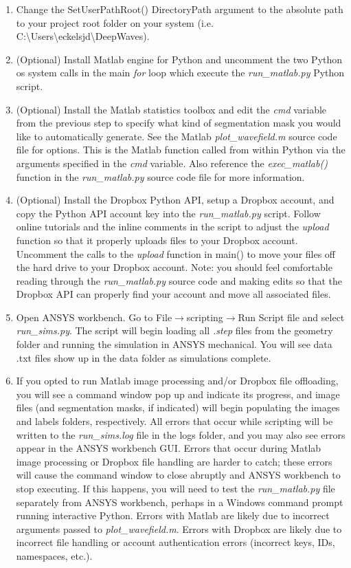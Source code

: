 \documentclass[11pt,letterpaper]{article}
\begin{document}
			\begin{enumerate}
			\item Change the SetUserPathRoot() DirectoryPath argument to the absolute path to your project root folder on your system (i.e. C:\textbackslash Users\textbackslash eckelsjd\textbackslash DeepWaves).
			\item (Optional) Install Matlab engine for Python and uncomment the two Python os system calls in the main \textit{for} loop which execute the \textit{run\_matlab.py} Python script.
			\item (Optional) Install the Matlab statistics toolbox and edit the \textit{cmd} variable from the previous step to specify what kind of segmentation mask you would like to automatically generate. See the Matlab \textit{plot\_wavefield.m} source code file for options. This is the Matlab function called from within Python via the arguments specified in the \textit{cmd} variable. Also reference the \textit{exec\_matlab()} function in the \textit{run\_matlab.py} source code file for more information.
			\item (Optional) Install the Dropbox Python API, setup a Dropbox account, and copy the Python API account key into the \textit{run\_matlab.py} script. Follow online tutorials and the inline comments in the script to adjust the \textit{upload} function so that it properly uploads files to your Dropbox account. Uncomment the calls to the \textit{upload} function in main() to move your files off the hard drive to your Dropbox account. Note: you should feel comfortable reading through the \textit{run\_matlab.py} source code and making edits so that the Dropbox API can properly find your account and move all associated files.
			\item Open ANSYS workbench. Go to File$\rightarrow$scripting$\rightarrow$Run Script file and select \textit{run\_sims.py}. The script will begin loading all \textit{.step} files from the geometry folder and running the simulation in ANSYS mechanical. You will see data .txt files show up in the data folder as simulations complete. 
			\item If you opted to run Matlab image processing and/or Dropbox file offloading, you will see a command window pop up and indicate its progress, and image files (and segmentation masks, if indicated) will begin populating the images and labels folders, respectively. All errors that occur while scripting will be written to the \textit{run\_sims.log} file in the logs folder, and you may also see errors appear in the ANSYS workbench GUI. Errors that occur during Matlab image processing or Dropbox file handling are harder to catch; these errors will cause the command window to close abruptly and ANSYS workbench to stop executing. If this happens, you will need to test the \textit{run\_matlab.py} file separately from ANSYS workbench, perhaps in a Windows command prompt running interactive Python. Errors with Matlab are likely due to incorrect arguments passed to \textit{plot\_wavefield.m}. Errors with Dropbox are likely due to incorrect file handling or account authentication errors (incorrect keys, IDs, namespaces, etc.). 
			\end{enumerate}
\end{document}
